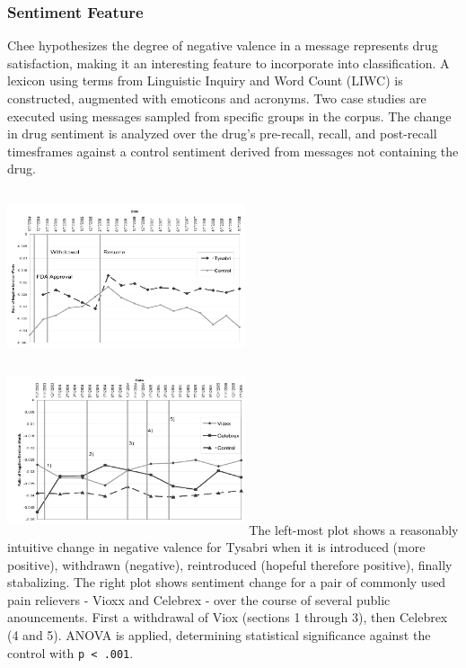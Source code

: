 \documentclass[twoside,11pt]{article}
\begin{document}
\subsubsection{Sentiment Feature}
 Chee hypothesizes the degree of negative valence in a message represents drug satisfaction, making it an interesting feature to incorporate into classification. A lexicon using terms from Linguistic Inquiry and Word Count (LIWC) is constructed, augmented with emoticons and acronyms. Two case studies are executed using messages sampled from specific groups in the corpus. The change in drug sentiment is analyzed over the drug's pre-recall, recall, and post-recall timesframes against a control sentiment derived from messages not containing the drug.

\includegraphics[width=7cm, height=5cm]{Figure-3-Tysabri.png}
\includegraphics[width=7cm, height=5cm]{Figure-4-Vioxx.png}
The left-most plot shows a reasonably intuitive change in negative valence for Tysabri when it is introduced (more positive), withdrawn (negative), reintroduced (hopeful therefore positive), finally stabalizing. The right plot shows sentiment change for a pair of commonly used pain relievers - Vioxx and Celebrex - over the course of several public anouncements. First a withdrawal of Viox (sections 1 through 3), then Celebrex (4 and 5). ANOVA is applied, determining statistical significance against the control with \verb|p < .001|.
\end{document}
